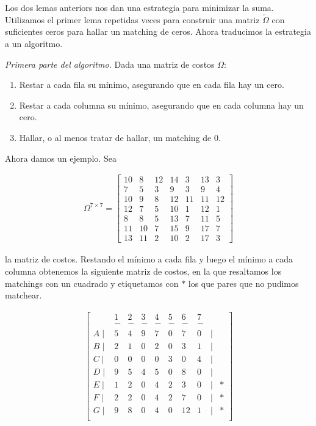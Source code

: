 \documentclass[a4paper]{article}
\begin{document}
Los dos lemas anteriors nos dan una estrategia para minimizar la suma. Utilizamos el primer 
lema repetidas veces para construir una matriz $\widetilde{ \Omega } $ con suficientes ceros 
para hallar un matching de ceros. Ahora traducimos la estrategia a un algoritmo. 

\textit{Primera parte del algoritmo.} Dada una matriz de costos $\Omega$:

\begin{enumerate}
    \item  Restar a cada fila su mínimo, asegurando que en cada fila hay un cero.
    \item Restar a cada columna su mínimo, asegurando que en cada columna hay un cero. 
    \item Hallar, o al menos tratar de hallar, un matching de 0.
\end{enumerate}

Ahora damos un ejemplo. Sea 

\begin{align*}
    \Omega^{7\times 7} = \begin{bmatrix} 
        10 & 8 & 12 & 14 & 3 & 13 & 3 \\ 
        7 & 5 & 3 & 9 & 3 & 9 & 4 \\ 
        10 & 9 & 8 & 12 & 11 & 11 & 12 \\ 
        12 & 7 & 5 & 10 & 1 & 12 & 1 \\ 
        8 & 8 & 5 & 13 & 7 & 11 & 5 \\ 
        11 & 10 & 7 & 15 & 9 & 17 & 7 \\ 
        13 & 11 & 2 & 10 & 2 & 17 & 3
    \end{bmatrix} 
\end{align*}

la matriz de costos. Restando el mínimo a cada fila y luego el mínimo a cada columna 
obtenemos la siguiente matriz de costos, en la que resaltamos los matchings con 
un cuadrado y etiquetamos con $*$ los que pares que no pudimos matchear.

\begin{align*}
    \begin{bmatrix} 
        & 1 & 2 & 3 & 4 & 5 & 6 & 7 \\ 
        & - & - & - & - & - & - & -\\
        A\mid&5& 4 &9 &7 &\boxed{ 0 }  &7 &0 &\mid & \\ 
        B\mid&2& 1 &\boxed{ 0 }  &2 &0 &3 &1 &\mid & \\ 
        C\mid&\boxed{ 0 } & 0 &0 &0 &3 &0 &4 &\mid & \\
        D\mid&9& 5 &4 &5 &0 &8 &\boxed{ 0 }  &\mid & \\
        E\mid&1& 2 &0 &4 &2 &3 &0 &\mid &* \\
        F\mid&2& 2 &0 &4 &2 &7 &0 &\mid &* \\
        G\mid&9& 8 &0 &4 &0 &12& 1&\mid &* \\
    \end{bmatrix} 
\end{align*}
\end{document}
